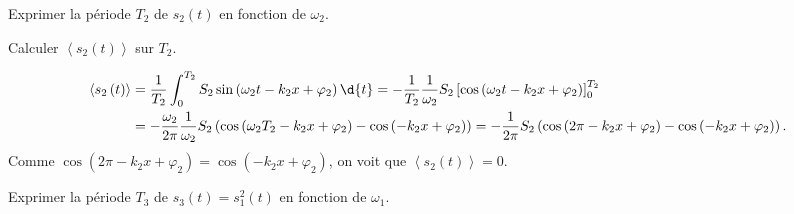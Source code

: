 


\begin{enonce}
	Exprimer la période $T_2$ de $s_2(t)$ en fonction de $\omega_2$.
	\end{enonce}
	





\begin{enonce}
Calculer $\left< s_2\left( t \right) \right>$ sur $T_2$.
\end{enonce}
	
	
\begin{corrige}
	\begin{align*}
	\left< s_2\left( t \right) \right> &= \frac{1}{T_2} \int_0^{T_2} S_2 \sin \left( \omega_2 t - k_2 x  + \varphi_2 \right) \d{t}
	= -\frac{1}{T_2}\frac{1}{\omega_2} S_2 \left[ \cos\left( \omega_2 t - k_2 x + \varphi_2 \right) \right]^{T_2}_{0} \\
	&= -\frac{\omega_2}{2\pi}\frac{1}{\omega_2} S_2 \left( \cos\left( \omega_2 T_2 - k_2 x + \varphi_2 \right) - \cos\left( -k_2 x + \varphi_2 \right)  \right)
	= -\frac{1}{2\pi} S_2 \left( \cos\left( 2\pi -k_2 x + \varphi_2 \right)  - \cos\left( -k_2 x + \varphi_2 \right)  \right).
	\end{align*}
	Comme $ \cos\left( 2\pi -k_2 x + \varphi_2 \right) =  \cos\left( -k_2 x + \varphi_2 \right)$, on voit que $\left< s_2\left( t \right) \right>=0$.
\end{corrige}



\begin{enonce}
	Exprimer la période $T_3$ de $s_3(t) = s_1^2(t)$ en fonction de $\omega_1$.
	\end{enonce}
	
